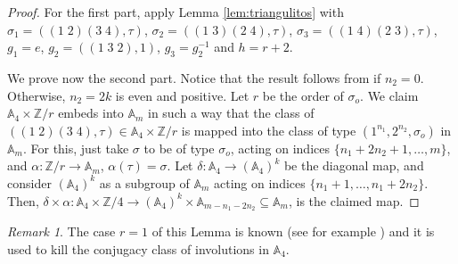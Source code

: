 \documentclass[11pt]{amsart} \textheight 22cm
\newcommand\sigmao{\sigma_{o}}
\renewcommand{\^}[1]{\mbox{$^{\left( #1 \right)}$}}
\renewcommand{\_}[1]{\mbox{$_{\left( #1 \right)}$}}
\newcommand\toba{{\mathfrak B }}
\newcommand{\Z}{{\mathbb Z}}
\newcommand{\Oc}{{\mathcal O}}
\theoremstyle{plain}
\theoremstyle{definition}
\theoremstyle{remark}
\newtheorem{obs}[lema]{Remark}
\newcommand\am{\mathbb A_m}
\newcommand\ac{\mathbb A_4}
\newcommand\A{\mathbb A}
\theoremstyle{remark}
\begin{document}
\begin{proof}
    For the first part, apply Lemma \ref{lem:triangulitos} with $\sigma_1=
    ((1\;2)(3\;4),\tau)$, $\sigma_2=  ((1\;3)(2\;4),\tau)$, $\sigma_3=((1\;4)(2\;3),\tau)$,
    $g_1=e$, $g_2=((1\;3\;2),1)$, $g_3=g_2^{-1}$ and $h=r+2$.

    We prove now the second part. Notice that the result follows from \cite[Th.~2.3]{AF2} if
    $n_2=0$. Otherwise, $n_2=2k$ is even and positive. Let $r$ be the order of $\sigma_o$.
    We claim  $\ac\times \Z/r$  embeds into $\A_m$ in such a way that the class of
    $((1\;2)(3\;4),\tau)\in\A_4\times \Z/r$ is mapped into the class of type
    $(1^{n_{1}},2^{n_{2}},\sigmao)$ in $\A_m$. For this, just take $\sigma$ to be of type
    $\sigma_o$, acting on indices $\{n_1+2n_2+1,\ldots,m\}$, and $\alpha:\Z/r\to\A_m$,
    $\alpha(\tau)=\sigma$.  Let $\delta:\ac\to(\ac)^k$ be the diagonal map, and consider
    $(\ac)^k$ as a subgroup of $\A_m$ acting on indices $\{n_1+1,\ldots,n_1+2n_2\}$. Then,
    $\delta\times\alpha:\ac\times \Z/4\to(\ac)^k\times\A_{m-n_1-2n_2}\subseteq\A_m$, is the
    claimed map.
    \end{proof}

\begin{obs}\label{obs:a4}
    The case $r=1$ of this Lemma is known (see for example \cite[Prop.~2.4]{AF2}) and it is
    used to kill the conjugacy class of involutions in $\mathbb{A}_4$.
\end{obs}
\end{document}
